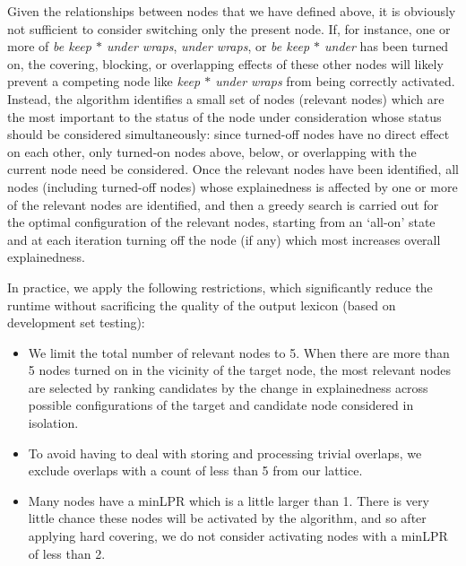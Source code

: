 \documentclass[11pt,letterpaper]{article}
\newcommand{\gap}{$*$\xspace}
\newcommand{\ex}[1]{\textit{#1}\xspace}
\begin{document}
Given the relationships between nodes that we have defined above, it is obviously not sufficient to consider switching only the present node. If, for instance, one or more of \ex{be keep \gap under wraps}, \ex{under wraps}, or \ex{be keep \gap under} has been turned on, the covering, blocking, or overlapping effects of these other nodes will likely prevent a competing node like \ex{keep \gap under wraps} from being correctly activated. Instead, the algorithm identifies a small set of nodes (relevant nodes) which are the most important to the status of the node under consideration whose status should be considered simultaneously: since turned-off nodes have no direct effect on each other, only turned-on nodes above, below, or overlapping with the current node need be considered.  Once the relevant nodes have been identified, all nodes (including turned-off nodes) whose explainedness is affected by one or more of the relevant nodes are identified, and then a greedy search is carried out for the optimal configuration of the relevant nodes, starting from an `all-on' state and at each iteration turning off the node (if any) which most increases overall explainedness.

In practice, we apply the following restrictions, which significantly reduce the runtime without sacrificing the quality of the output lexicon (based on development set testing):
\begin{itemize}
\item We limit the total number of relevant nodes to 5. When there are more than 5 nodes turned on in the vicinity of the target node, the most relevant nodes are selected by ranking candidates by the change in explainedness across possible configurations of the target and candidate node considered in isolation.
\item To avoid having to deal with storing and processing trivial overlaps, we exclude overlaps with a count of less than 5 from our lattice.
\item Many nodes have a minLPR which is a little larger than 1. There is very little chance these nodes will be activated by the algorithm, and so after applying hard covering, we do not consider activating nodes with a minLPR of less than 2.
\end{itemize}
\end{document}
